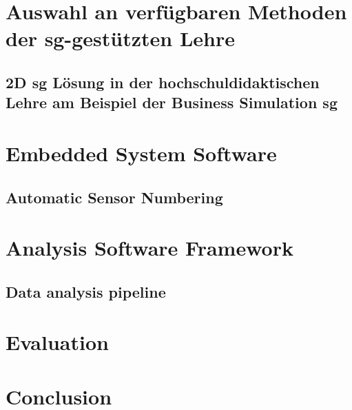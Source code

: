 \documentclass[conference]{IEEEtran}
\begin{document}
\section{Auswahl an verfügbaren Methoden der \gls{sg}-gestützten Lehre}

\subsection{2D \gls{sg} Lösung in der hochschuldidaktischen Lehre am Beispiel der Business Simulation \gls{sg}}




\section{Embedded System Software}

\subsection{Automatic Sensor Numbering}




\section{Analysis Software Framework}

\subsection{Data analysis pipeline}





\section{Evaluation}


\section{Conclusion}
\end{document}
